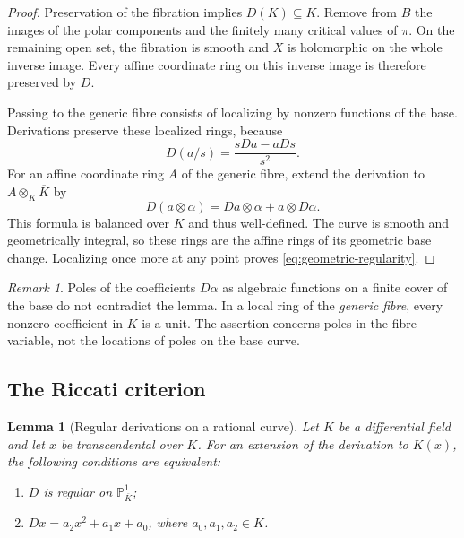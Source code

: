 \documentclass[11pt,reqno]{amsart}
\numberwithin{equation}{section}
\newtheorem{lemma}[theorem]{Lemma}
\theoremstyle{definition}
\theoremstyle{remark}
\newtheorem{remark}[theorem]{Remark}
\newcommand{\PP}{\mathbb P}
\begin{document}
\begin{proof}
Preservation of the fibration implies $D(K)\subseteq K$. Remove from
$B$ the images of the polar components and the finitely many critical
values of $\pi$. On the remaining open set, the fibration is smooth and
$X$ is holomorphic on the whole inverse image. Every affine coordinate
ring on this inverse image is therefore preserved by $D$.

Passing to the generic fibre consists of localizing by nonzero functions
of the base. Derivations preserve these localized rings, because
\[
 D(a/s)=\frac{sDa-aDs}{s^2}.
\]
For an affine coordinate ring $A$ of the generic fibre, extend the
derivation to $A\otimes_K\overline K$ by
\begin{equation}
 D(a\otimes\alpha)=Da\otimes\alpha+a\otimes D\alpha.
 \label{eq:tensor-derivation}
\end{equation}
This formula is balanced over $K$ and thus well-defined. The curve is
smooth and geometrically integral, so these rings are the affine rings
of its geometric base change. Localizing once more at any point proves
\eqref{eq:geometric-regularity}.
\end{proof}

\begin{remark}
\label{rem:semilinear}
Poles of the coefficients $D\alpha$ as algebraic functions on a finite
cover of the base do not contradict the lemma. In a local ring of the
\emph{generic fibre}, every nonzero coefficient in $\overline K$ is a
unit. The assertion concerns poles in the fibre variable, not the
locations of poles on the base curve.
\end{remark}

\subsection{The Riccati criterion}

\begin{lemma}[Regular derivations on a rational curve]
\label{lem:riccati}
Let $K$ be a differential field and let $x$ be transcendental over $K$.
For an extension of the derivation to $K(x)$, the following conditions
are equivalent:
\begin{enumerate}
\item $D$ is regular on $\PP^1_{\overline K}$;
\item $Dx=a_2x^2+a_1x+a_0$, where $a_0,a_1,a_2\in K$.
\end{enumerate}
\end{lemma}
\end{document}

